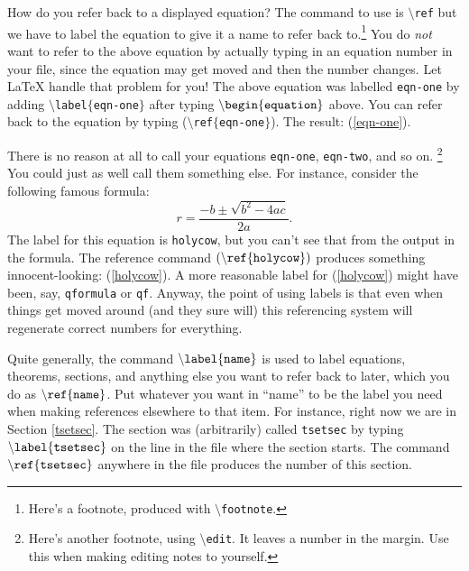 \documentclass[12pt,letterpaper]{amsart}
\newcommand{\latex}{\LaTeX}
\newcommand{\sm}{\setminus}
\newcommand{\pln}[1]{$\sm${\tt #1}}
\newcommand{\bgn}[1]{$\tt {\sm}begin\{#1\}$}
\newcommand{\marginalfootnote}[1]{%
        \footnote{#1}
        \marginpar[\hfill{\sf\thefootnote}]{{\sf\thefootnote}}}
\newcommand{\edit}[1]{\marginalfootnote{#1}}
\theoremstyle{plain}
\theoremstyle{definition}
\numberwithin{equation}{section}
\begin{document}
How do you refer back to a displayed equation?  
The command to use is \pln{ref}
but we have to label the equation to give it 
a name to refer back to.\footnote{Here's a footnote, produced with \pln{footnote}.}
You do {\it not} want to 
refer to the above equation by actually typing 
in an equation number in your file, since the equation may get moved
and then the number changes.  Let \latex{} handle that problem for you!
The above equation was labelled {\tt eqn-one} by adding 
{\tt $\sm$label$\{$eqn-one$\}$} after typing 
\bgn{equation} above.
You can refer back to the equation by typing 
(\pln{ref}$\{${\tt eqn-one}$\}$). The result: (\ref{eqn-one}).

There is no reason at all to call your equations {\tt eqn-one}, {\tt eqn-two}, 
and so on.\edit{Here's another footnote, using 
\pln{edit}. It leaves a number 
in the margin.  Use this when making editing notes to yourself.}
You could just as well call them something else.  For instance, 
consider the following famous formula:
\begin{equation}\label{holycow} 
r = \frac{-b \pm \sqrt{b^2-4ac}}{2a}.
\end{equation}
The label for this equation is 
{\tt holycow}, but you can't see that from 
the output in the formula. 
The reference command 
$\tt ({\sm}ref\{holycow\})$ 
produces something innocent-looking: (\ref{holycow}). 
A more reasonable label for 
(\ref{holycow}) might have been, say, {\tt qformula} or {\tt qf}.
Anyway, the point of using labels is that even when things get moved around 
(and they sure will) this referencing system will regenerate 
correct numbers for everything. 

Quite generally, the command $\tt {\sm}label\{name\}$ is used to 
label equations, theorems, sections, and anything else you 
want to refer back to later, which you do as $\tt {\sm}ref\{name\}$.
Put whatever you want in ``name'' to be the label you need 
when making references elsewhere to that item.
For instance, right now we are in Section \ref{tsetsec}. 
The section was (arbitrarily) called {\tt tsetsec} by 
typing $\tt {\sm}label\{tsetsec\}$ on the line in the file where 
the section starts. 
The command $\tt {\sm}ref\{tsetsec\}$ anywhere in the file 
produces the number of this section.
\end{document}
